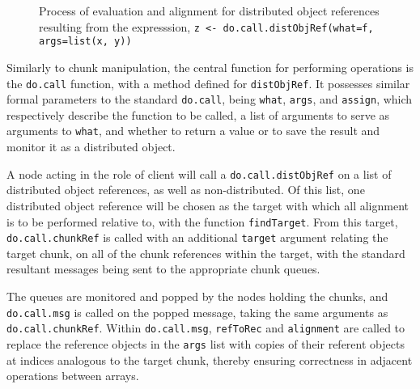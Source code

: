 \begin{figure}
	\caption{\label{fig:distobj}Process of evaluation and alignment for
	distributed object references resulting from the expresssion,
	\texttt{z <- do.call.distObjRef(what=f, args=list(x, y))}}
\end{figure}

Similarly to chunk manipulation, the central function for performing operations
is the \texttt{do.call} function, with a method defined for
\texttt{distObjRef}. It possesses similar formal parameters to the standard
\texttt{do.call}, being \texttt{what}, \texttt{args}, and
\texttt{assign}, which respectively describe the function to be called, a list
of arguments to serve as arguments to \texttt{what}, and whether to return a
value or to save the result and monitor it as a distributed object.

A node acting in the role of client will call a
\texttt{do.call.distObjRef} on a list of distributed object
references, as well as non-distributed.
Of this list, one distributed object reference will be chosen as the target
with which all alignment is to be performed relative to, with the function
\texttt{findTarget}.
From this target, \texttt{do.call.chunkRef} is called with an
additional \texttt{target} argument relating the target chunk, on all of the
chunk references within the target, with the standard resultant messages being
sent to the appropriate chunk queues.

The queues are monitored and popped by the nodes holding the chunks, and
\texttt{do.call.msg} is called on the popped message, taking the
same arguments as \texttt{do.call.chunkRef}.
Within \texttt{do.call.msg}, \texttt{refToRec}
and \texttt{alignment} are called to replace the reference
objects in the \texttt{args} list with copies of their referent objects at
indices analogous to the target chunk, thereby ensuring correctness in
adjacent operations between arrays.

